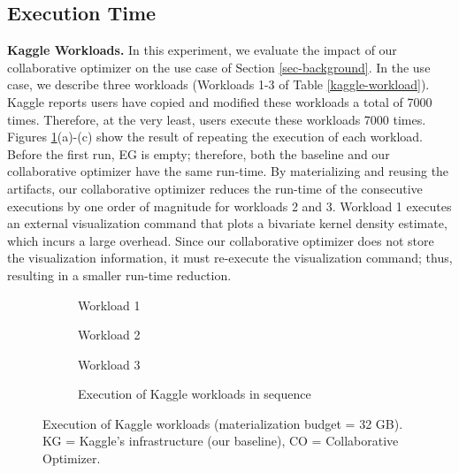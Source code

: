 \subsection{Execution Time}
\textbf{Kaggle Workloads.}
In this experiment, we evaluate the impact of our collaborative optimizer on the use case of Section \ref{sec-background}.
In the use case, we describe three workloads (Workloads 1-3 of Table \ref{kaggle-workload}).
Kaggle reports users have copied and modified these workloads a total of 7000 times.
Therefore, at the very least, users execute these workloads 7000 times.
Figures \ref{exp-reuse-kaggle-same-workload}(a)-(c) show the result of repeating the execution of each workload.
Before the first run, EG is empty; therefore, both the baseline and our collaborative optimizer have the same run-time.
By materializing and reusing the artifacts, our collaborative optimizer reduces the run-time of the consecutive executions by one order of magnitude for workloads 2 and 3.
Workload 1 executes an external visualization command that plots a bivariate kernel density estimate, which incurs a large overhead.
Since our collaborative optimizer does not store the visualization information, it must re-execute the visualization command; thus, resulting in a smaller run-time reduction.
\begin{figure}
\begin{subfigure}[b]{0.33\linewidth}
\centering
 \resizebox{\columnwidth}{!}{%
%
}
\caption{Workload 1}
\end{subfigure}%
\begin{subfigure}[b]{0.33\linewidth}
\centering
 \resizebox{\columnwidth}{!}{%
%
}
\caption{Workload 2}
\end{subfigure}%
\begin{subfigure}[b]{0.33\linewidth}
\centering
 \resizebox{\columnwidth}{!}{%
%
}
\caption{Workload 3}
\end{subfigure}
\begin{subfigure}[b]{\linewidth}
\centering
 \resizebox{\columnwidth}{!}{%
%
}
\caption{Execution of Kaggle workloads in sequence}
\end{subfigure}
\caption{Execution of Kaggle workloads (materialization budget = 32 GB). KG = Kaggle's infrastructure (our baseline), CO = Collaborative Optimizer.}
\label{exp-reuse-kaggle-same-workload}
\end{figure}

